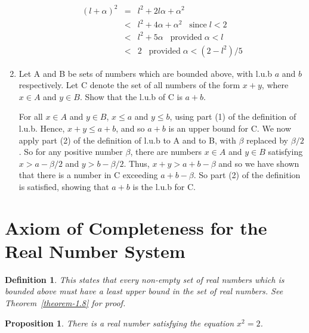 \documentclass[12pt]{scrbook}
\newtheorem*{definition}{Definition}
\newtheorem{proposition}{Proposition}[section]
\begin{document}
\begin{enumerate}
	\begin{eqnarray*}
	(l + \alpha)^2 	&=& l^2 + 2 l \alpha  + \alpha^2 \\
				&<& l^2 + 4 \alpha + \alpha^2 \;\;\; \text{since} \; l < 2 \\
				&<&  l^2 + 5 \alpha \;\;\; \text{provided} \; \alpha < l \\
				&<&  2 \;\;\;  \text{provided} \; \alpha < (2 - l^2)/5
	\end{eqnarray*}
	
	
	\item Let A and B be sets of numbers which are bounded above, with l.u.b $a$ and $b$ respectively.  Let C denote the set of all numbers of the form $x + y$, where $x \in A$ and $y \in B$.  Show that the l.u.b of C is $a + b$.
	
	For all $x \in A$ and $y \in B$, $x \leq a$ and $y \leq b$, using part (1) of the definition of l.u.b.  Hence, $x + y \leq a + b$, and so $a + b$ is an upper bound for C.  We now apply part (2) of the definition of l.u.b to A and to B, with $\beta$ replaced by $\beta/2$.  So for any positive number $\beta$, there are numbers $x \in A$ and $y \in B$ satisfying $x > a - \beta/2$ and $y > b - \beta/2$.  Thus, $ x + y > a + b - \beta $ and so we have shown that there is a number in C exceeding $ a + b - \beta $.  So part (2) of the definition is satisfied, showing that $a + b$ is the l.u.b for C.
	
\end{enumerate}

\section{Axiom of Completeness for the Real Number System}

\begin{definition}
	This states that every non-empty set of real numbers which is bounded above must have a least upper bound in the set of real numbers.  See Theorem~\ref{theorem-1.8} for proof.
\end{definition}

\begin{proposition}
\label{prop-sqrt-two}
There is a real number satisfying the equation $x^2 = 2$.
\end{proposition}
\end{document}
